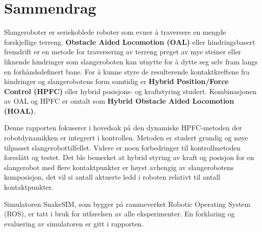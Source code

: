 \chapter{Sammendrag}




Slangeroboter er seriekoblede roboter som evner å traversere en mengde forskjellige terreng. \textbf{Obstacle Aided Locomotion (OAL)} eller hindringsbasert fremdrift er en metode for traversering av terreng preget av mye steiner eller liknende hindringer som slangeroboten kan utnytte for å dytte seg selv fram langs en forhåndsdefinert bane. For å kunne styre de resulterende kontaktkreftene fra hindringer og slangerobotens form samtidig er \textbf{Hybrid Position/Force Control (HPFC)} eller hybrid posisjons- og kraftstyring studert. Kombinasjonen av OAL og HPFC er omtalt som \textbf{Hybrid Obstacle Aided Locomotion (HOAL)}.

Denne rapporten fokuserer i hovedsak på den dynamiske HPFC-metoden der robotdynamikken er integrert i kontrollen. Metoden er studert grundig og nøye tilpasset slangerobottilfellet. Videre er noen forbedringer til kontrollmetoden foreslått og testet. Det ble bemerket at hybrid styring av kraft og posisjon for en slangerobot med flere kontaktpunkter er høyst avhengig av slangerobotens komposisjon, det vil si antall aktuerte ledd i roboten relativt til antall kontaktpunkter.

Simulatoren SnakeSIM, som bygger på rammeverket Robotic Operating System (ROS), er tatt i bruk for utførelsen av alle eksperimenter. En forklaring og evaluering av simulatoren er gitt i rapporten.


\makeatletter
{}


\makeatother







